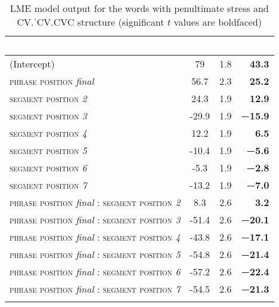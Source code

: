 \documentclass[output=paper]{langscibook}
\begin{document}
\begin{paperappendix}
\begin{table}%
    \caption{LME model output for the words with penultimate stress and CV.ˈCV.CVC structure (significant $t$ values are boldfaced)}
    \begin{tabular}{l S[table-format=-2.1] c r}
    \lsptoprule
     \ &  &  &   \\
    \midrule
    (Intercept) & 79 & 1.8   & \textbf{43.3} \\
    \textsc{phrase position} \textit{final} & 56.7 & 2.3 & \textbf{25.2} \\
    \textsc{segment position} \textit{2} & 24.3 & 1.9 & \textbf{12.9} \\
    \textsc{segment position} \textit{3} & -29.9 & 1.9 & \textbf{−15.9} \\
    \textsc{segment position} \textit{4} & 12.2 & 1.9 & \textbf{6.5} \\
    \textsc{segment position} \textit{5} & -10.4 & 1.9 & \textbf{−5.6} \\
    \textsc{segment position} \textit{6} & -5.3 & 1.9 & \textbf{−2.8} \\
    \textsc{segment position} \textit{7} & -13.2 & 1.9 & \textbf{−7.0} \\
    \textsc{phrase position} \textit{final} : \textsc{segment position} \textit{2} & 8.3 & 2.6 & \textbf{3.2} \\
    \textsc{phrase position} \textit{final} : \textsc{segment position} \textit{3} & -51.4 & 2.6 & \textbf{−20.1} \\
    \textsc{phrase position} \textit{final} : \textsc{segment position} \textit{4} & -43.8 & 2.6 & \textbf{−17.1} \\
    \textsc{phrase position} \textit{final} : \textsc{segment position} \textit{5} & -54.8 & 2.6 & \textbf{−21.4} \\
    \textsc{phrase position} \textit{final} : \textsc{segment position} \textit{6} & -57.2 & 2.6 & \textbf{−22.4} \\
    \textsc{phrase position} \textit{final} : \textsc{segment position} \textit{7} & -54.5 & 2.6 & \textbf{−21.3} \\
    \lspbottomrule
    \end{tabular}
\end{table}



\end{paperappendix}
\end{document}
